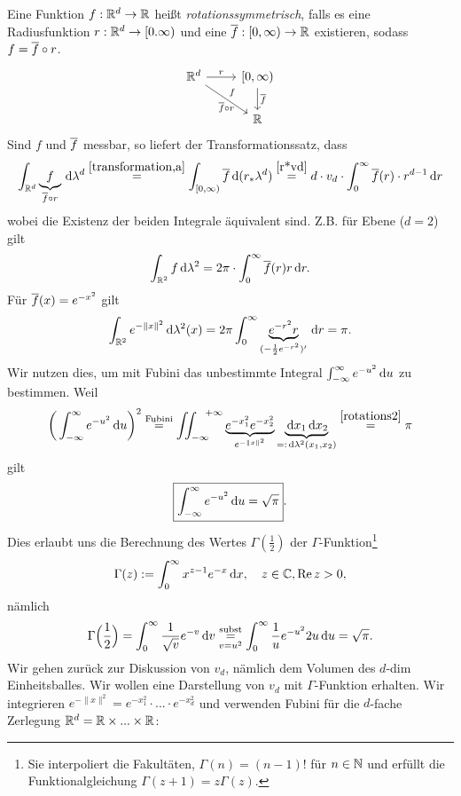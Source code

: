 \begin{example}
Eine Funktion $f:\mathbb{R}^d \to \mathbb{R}$ heißt \emph{rotationssymmetrisch}, falls es eine Radiusfunktion $r:\mathbb{R}^d\to [0.\infty)$ und eine $\overline{f}:[0,\infty)\to \mathbb{R}$ existieren, sodass $f= \overline{f}\circ r$.
$$
\begin{tikzcd}
	\R^d		\arrow{r}{r} \arrow{dr}{f} [below]{\ol{f}\circ r}	&		{[}0,\infty)	 \arrow{d}{\ol{f}}\\
								   &		\R
\end{tikzcd}
$$
Sind $f$ und $\overline{f}$ messbar, so liefert der Transformationssatz, dass
\begin{equation}\label{rotations}
\int_{\mathbb{R}^d} \underbrace{f}_{\overline{f}\circ r} \, \mathrm{d} \lambda^d \overset{\eqref{transformation,a}}= \int_{[0,\infty)} \overline{f} \, \mathrm{d} (r_*\lambda^d) \overset{\eqref{r*vd}}= d\cdot v_d \cdot \int_0^\infty \overline{f}(r)\cdot r^{d-1}\, \mathrm{d} r
\end{equation}
wobei die Existenz der beiden Integrale äquivalent sind. Z.B. für Ebene ($d=2$) gilt
$$\int_{\mathbb{R}^2}f\, \mathrm{d}\lambda^2=2\pi \cdot \int_0^\infty \overline{f}(r)r\, \mathrm{d} r.$$
Für $\overline{f}(x)=e^{-x^2}$ gilt
\begin{equation} \label{rotations2}
\int_{\mathbb{R}^2}e^{-\|x\|^2}\, \mathrm{d}\lambda^2(x) = 2\pi \int_0^\infty \underbrace{e^{-r^2}r}_{(-\frac{1}{2}e^{-r^2})'}\, \mathrm{d} r =\pi.
\end{equation}
Wir nutzen dies, um mit Fubini das unbestimmte Integral 
$\int_{-\infty}^\infty e^{-u^2}\, \mathrm{d} u$
zu bestimmen. Weil
$$
\bigg( \int_{-\infty}^\infty e^{-u^2}\, \mathrm{d} u\bigg)^2 \overset{\text{Fubini}}= \iint_{-\infty}^{ \ \ +\infty} \underbrace{e^{-x_1^2}e^{-x_2^2}}_{e^{-\|x\|^2}}\underbrace{\, \mathrm{d} x_1\, \mathrm{d} x_2}_{=: \, \mathrm{d}\lambda^2(x_1,x_2)} \overset{\eqref{rotations2}}= \pi
$$
gilt
$$\boxed{\int_{-\infty}^\infty e^{-u^2}\, \mathrm{d} u = \sqrt{\pi}}.$$
Dies erlaubt uns die Berechnung des Wertes $\Gamma(\frac{1}{2})$ der $\Gamma$-Funktion\footnote{Sie interpoliert die Fakultäten, $\Gamma(n)=(n-1)!$ für $n\in\mathbb{N}$ und erfüllt die Funktionalgleichung $\Gamma(z+1)=z\Gamma(z)$.}
$$\Gamma (z):= \int_0^\infty x^{z-1}e^{-x}\, \mathrm{d} x,\quad z\in \mathbb{C}, \operatorname{Re}z> 0,$$
nämlich 
$$\Gamma\Big(\frac{1}{2}\Big) = \int_0^\infty \frac{1}{\sqrt{v}}e^{-v}\, \mathrm{d} v \underset{v=u^2}{\overset{\text{subst}}=} \int_0^\infty \frac{1}{u}e^{-u^2}2u\, \mathrm{d} u=\sqrt{\pi}.$$
Wir gehen zurück zur Diskussion von $v_d$, nämlich dem Volumen des $d$-dim Einheitsballes. Wir wollen eine Darstellung von $v_d$ mit $\Gamma$-Funktion erhalten. Wir integrieren $e^{-\|x\|^2}=e^{-x_1^2}\cdot ...\cdot e^{-x_d^2}$ und verwenden Fubini für die $d$-fache Zerlegung $\mathbb{R}^d=\mathbb{R}\times ...\times \mathbb{R}$:

\end{example}
